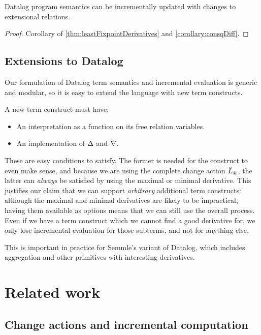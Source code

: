 \begin{thm}
\label{thm:diffUpdate}
  Datalog program semantics can be incrementally updated with changes to
  extensional relations.
\end{thm}
\ifproofs
\begin{proof}
  Corollary of \cref{thm:leastFixpointDerivatives} and \cref{corollary:consqDiff}.
\end{proof}
\fi

\subsection{Extensions to Datalog}
\label{sec:extensions}

Our formulation of Datalog term semantics and incremental evaluation is 
generic and modular, so it is easy to extend the language with new
term constructs.

A new term construct must have:
\begin{itemize}
  \item An interpretation as a function on its free relation variables.
  \item An implementation of $\Delta$ and $\nabla$.
\end{itemize}

These are easy conditions to satisfy. The former is needed for the construct to even
make sense, and because we are using the complete change action
$\hat{L}_\circledast$, the latter can \emph{always} be satisfied by using the maximal or
minimal derivative. This justifies our claim that we can support
\emph{arbitrary} additional term constructs: although the maximal and minimal
derivatives are likely to be impractical, having them
available as options means that we can still use the overall process.
Even if we have a term construct which we cannot find a good derivative for, we only lose incremental
evaluation for those subterms, and not for anything else.

This is important in practice for Semmle's variant of Datalog, which includes
aggregation and other primitives with interesting derivatives. 

\section{Related work}

\subsection{Change actions and incremental computation}

